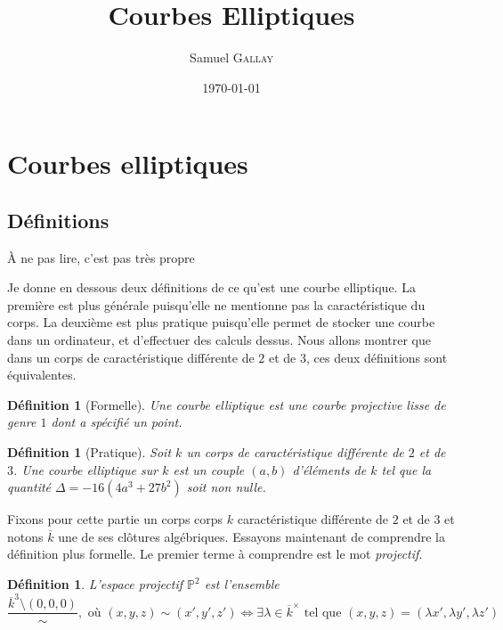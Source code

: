 \documentclass{article}
\title{Courbes Elliptiques}
\author{Samuel \textsc{Gallay}}
\date{\today}
\theoremstyle{plain}%
\newtheorem{deff}[thm]{Définition}
\theoremstyle{definition}%
\begin{document}
\maketitle





\section{Courbes elliptiques}

\subsection{Définitions}

{\color{red} À ne pas lire, c'est pas très propre}

Je donne en dessous deux définitions de ce qu'est une courbe elliptique. La première est plus générale puisqu'elle ne mentionne pas la  caractéristique du corps. La deuxième est plus pratique puisqu'elle permet de stocker une courbe dans un ordinateur, et d'effectuer des calculs dessus. Nous allons montrer que dans un corps de caractéristique différente de $2$ et de $3$, ces deux définitions sont équivalentes.

\begin{deff}[Formelle]
  Une courbe elliptique est une courbe projective lisse de genre $1$ dont a spécifié un point.
\end{deff}

\begin{deff}[Pratique]
  Soit $k$ un corps de caractéristique différente de $2$ et de $3$. Une courbe elliptique sur $k$ est un couple $(a, b)$ d'éléments de $k$ tel que la quantité $\Delta =-16(4a^3+ 27b^2)$ soit non nulle.
\end{deff}

Fixons pour cette partie un corps corps $k$ caractéristique différente de $2$ et de $3$ et notons $\overline{k}$ une de ses clôtures algébriques. Essayons maintenant de comprendre la définition plus formelle. Le premier terme à comprendre est le mot \emph{projectif}.

\begin{deff}
  L'espace projectif $\mathbb{P}^2$ est l'ensemble $$\frac{\overline{k}^3\setminus(0, 0, 0)}{\sim},\text{\ \ où\ \ } (x, y, z) \sim (x', y', z') \iff \exists \lambda \in \overline{k}^\times \text{ tel que } (x, y, z) = (\lambda x', \lambda y', \lambda z')$$
\end{deff}
\end{document}
